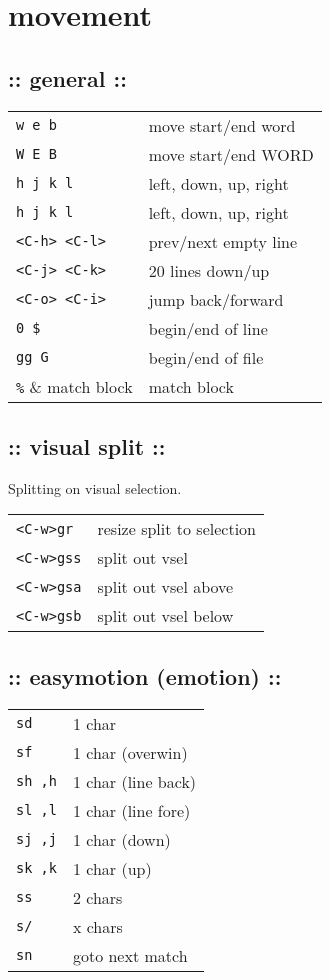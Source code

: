 \section{\hrulefill movement\hrulefill}

\subsection{:: general ::}
\begin{tabular}{@{}ll@{}}
    \verb!w e b!            & move start/end word \\
    \verb!W E B!            & move start/end WORD \\
    \verb!h j k l!          & left, down, up, right \\
    \verb!h j k l!          & left, down, up, right \\
    \verb!<C-h> <C-l>!      & prev/next empty line \\
    \verb!<C-j> <C-k>!      & 20 lines down/up \\
    \verb!<C-o> <C-i>!      & jump back/forward \\
    \verb!0 $!              & begin/end of line \\
    \verb!gg G!             & begin/end of file \\
    \verb!%!                & match block \\
\end{tabular}

\subsection{:: visual split ::}
Splitting on visual selection. \\
\begin{tabular}{@{}ll@{}}
    \verb!<C-w>gr!          & resize split to selection \\
    \verb!<C-w>gss!         & split out vsel \\
    \verb!<C-w>gsa!         & split out vsel above \\
    \verb!<C-w>gsb!         & split out vsel below \\
\end{tabular}

\subsection{:: easymotion (emotion) ::}
\begin{tabular}{@{}ll@{}}
    \verb!sd!     & 1 char \\
    \verb!sf!     & 1 char (overwin) \\
    \verb!sh ,h!  & 1 char (line back) \\
    \verb!sl ,l!  & 1 char (line fore) \\
    \verb!sj ,j!  & 1 char (down) \\
    \verb!sk ,k!  & 1 char (up) \\
    \verb!ss!     & 2 chars \\
    \verb!s/!     & x chars \\
    \verb!sn!     & goto next match \\
\end{tabular}
